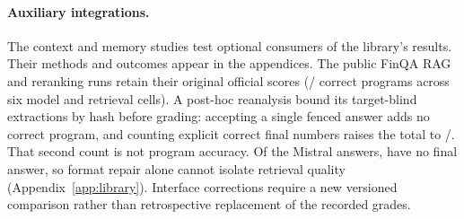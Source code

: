 \paragraph{Auxiliary integrations.}
The context and memory studies test optional consumers of the library's results.
Their methods and outcomes appear in the appendices. The public FinQA RAG and reranking
runs retain their original official scores (\FQLegacyTotal/\FQAnswers{} correct programs
across six model and retrieval cells). A post-hoc reanalysis bound its target-blind
extractions by hash before grading: accepting a single fenced answer adds no correct
program, and counting explicit correct final numbers raises the total to
\FQRecoverableTotal/\FQAnswers. That second count is not program accuracy. Of the
\FQMistralAnswers{} Mistral answers, \FQMistralMissingTotal{} have no final answer, so
format repair alone cannot isolate retrieval quality (Appendix~\ref{app:library}).
Interface corrections require a new versioned comparison rather than retrospective
replacement of the recorded grades.
